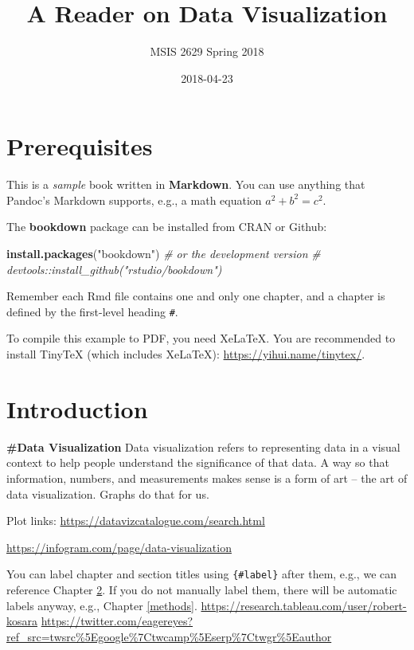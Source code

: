 \documentclass[]{book}
\title{A Reader on Data Visualization}
\author{MSIS 2629 Spring 2018}
\date{2018-04-23}
\newenvironment{Shaded}{\begin{snugshade}}{\end{snugshade}}
\newcommand{\KeywordTok}[1]{\textcolor[rgb]{0.13,0.29,0.53}{\textbf{#1}}}
\newcommand{\StringTok}[1]{\textcolor[rgb]{0.31,0.60,0.02}{#1}}
\newcommand{\CommentTok}[1]{\textcolor[rgb]{0.56,0.35,0.01}{\textit{#1}}}
\newcommand{\NormalTok}[1]{#1}
\theoremstyle{definition}
\theoremstyle{definition}
\theoremstyle{definition}
\theoremstyle{remark}
\begin{document}
\maketitle

{
\setcounter{tocdepth}{1}
\tableofcontents
}
\chapter{Prerequisites}\label{prerequisites}

This is a \emph{sample} book written in \textbf{Markdown}. You can use
anything that Pandoc's Markdown supports, e.g., a math equation
\(a^2 + b^2 = c^2\).

The \textbf{bookdown} package can be installed from CRAN or Github:

\begin{Shaded}
\begin{Highlighting}[]
\KeywordTok{install.packages}\NormalTok{(}\StringTok{"bookdown"}\NormalTok{)}
\CommentTok{# or the development version}
\CommentTok{# devtools::install_github("rstudio/bookdown")}
\end{Highlighting}
\end{Shaded}

Remember each Rmd file contains one and only one chapter, and a chapter
is defined by the first-level heading \texttt{\#}.

To compile this example to PDF, you need XeLaTeX. You are recommended to
install TinyTeX (which includes XeLaTeX):
\url{https://yihui.name/tinytex/}.

\chapter{Introduction}\label{intro}

\textbf{\#Data Visualization} Data visualization refers to representing
data in a visual context to help people understand the significance of
that data. A way so that information, numbers, and measurements makes
sense is a form of art -- the art of data visualization. Graphs do that
for us.

Plot links: \url{https://datavizcatalogue.com/search.html}

\url{https://infogram.com/page/data-visualization}

You can label chapter and section titles using \texttt{\{\#label\}}
after them, e.g., we can reference Chapter \ref{intro}. If you do not
manually label them, there will be automatic labels anyway, e.g.,
Chapter \ref{methods}.
\url{https://research.tableau.com/user/robert-kosara}
\url{https://twitter.com/eagereyes?ref_src=twsrc\%5Egoogle\%7Ctwcamp\%5Eserp\%7Ctwgr\%5Eauthor}
\end{document}
